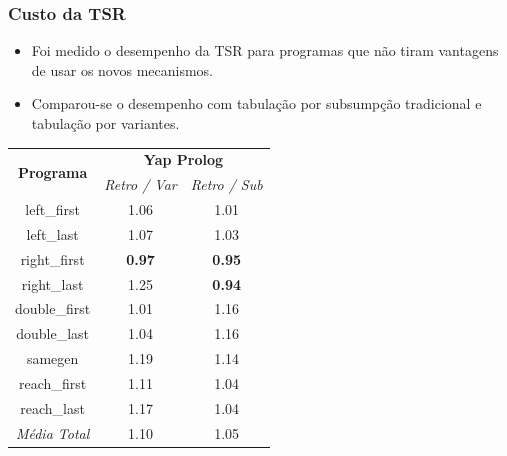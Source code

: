 \documentclass{beamer}
\begin{document}
\begin{frame}
   \frametitle{Custo da TSR}
   \begin{itemize}
      \item Foi medido o desempenho da TSR para programas que não tiram vantagens de usar os novos
      mecanismos.
      \item Comparou-se o desempenho com tabulação por subsumpção tradicional e tabulação por variantes.
   \end{itemize}
   \pause
   \begin{center}
      {\footnotesize
     \begin{tabular}{ccc}
      \hline
       \hline
       \multirow{2}{*}{\textbf{Programa}} & \multicolumn{2}{c}{\textbf{Yap Prolog}} \\
       & \textit{\small{Retro / Var}} & \textit{\small{Retro / Sub}} \\
      \hline
      \hline
      left\_first & 1.06 & 1.01 \\
      left\_last &  1.07  & 1.03 \\
      right\_first & \textbf{0.97} & \textbf{0.95} \\
      right\_last & 1.25 & \textbf{0.94} \\
      double\_first & 1.01 & 1.16 \\
      double\_last & 1.04 & 1.16 \\
      samegen & 1.19 & 1.14 \\
      reach\_first  &  1.11  & 1.04 \\
      reach\_last  &  1.17  & 1.04 \\
   \hline
   \hline
   \textit{Média Total} &  1.10 &  1.05 \\
   \hline
   \hline
   \end{tabular}}
\end{center}
\end{frame}
\end{document}
